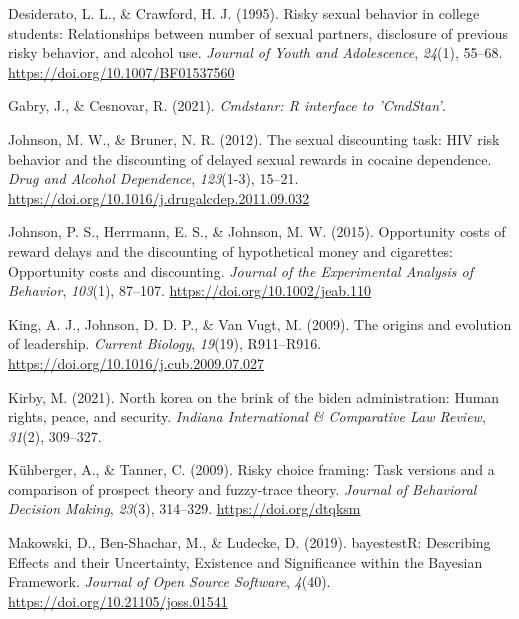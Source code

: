 \documentclass[
  donotrepeattitle,doc, 12pt, a4paper,floatsintext]{apa7}
\newlength{\cslhangindent}
\newlength{\cslentryspacingunit} %
\newenvironment{CSLReferences}[2] %
 {%
  \setlength{\parindent}{0pt}
  \ifodd #1
  \let\oldpar\par
  \def\par{\hangindent=\cslhangindent\oldpar}
  \fi
  \setlength{\parskip}{#2\cslentryspacingunit}
 }%
 {}
\begin{document}
\begin{CSLReferences}{1}{0}
\leavevmode{}%
Desiderato, L. L., \& Crawford, H. J. (1995). Risky sexual behavior in college students: Relationships between number of sexual partners, disclosure of previous risky behavior, and alcohol use. \emph{Journal of Youth and Adolescence}, \emph{24}(1), 55--68. \url{https://doi.org/10.1007/BF01537560}

\leavevmode{}%
Gabry, J., \& Cesnovar, R. (2021). \emph{Cmdstanr: {R} interface to '{CmdStan}'}.

\leavevmode{}%
Johnson, M. W., \& Bruner, N. R. (2012). The sexual discounting task: {HIV} risk behavior and the discounting of delayed sexual rewards in cocaine dependence. \emph{Drug and Alcohol Dependence}, \emph{123}(1-3), 15--21. \url{https://doi.org/10.1016/j.drugalcdep.2011.09.032}

\leavevmode{}%
Johnson, P. S., Herrmann, E. S., \& Johnson, M. W. (2015). Opportunity costs of reward delays and the discounting of hypothetical money and cigarettes: Opportunity costs and discounting. \emph{Journal of the Experimental Analysis of Behavior}, \emph{103}(1), 87--107. \url{https://doi.org/10.1002/jeab.110}

\leavevmode{}%
King, A. J., Johnson, D. D. P., \& Van Vugt, M. (2009). The origins and evolution of leadership. \emph{Current Biology}, \emph{19}(19), R911--R916. \url{https://doi.org/10.1016/j.cub.2009.07.027}

\leavevmode{}%
Kirby, M. (2021). North korea on the brink of the biden administration: Human rights, peace, and security. \emph{Indiana International \& Comparative Law Review}, \emph{31}(2), 309--327.

\leavevmode{}%
Kühberger, A., \& Tanner, C. (2009). Risky choice framing: Task versions and a comparison of prospect theory and fuzzy-trace theory. \emph{Journal of Behavioral Decision Making}, \emph{23}(3), 314--329. \url{https://doi.org/dtqksm}

\leavevmode{}%
Makowski, D., Ben-Shachar, M., \& Ludecke, D. (2019). {bayestestR}: {Describing Effects} and their {Uncertainty}, {Existence} and {Significance} within the {Bayesian Framework}. \emph{Journal of Open Source Software}, \emph{4}(40). \url{https://doi.org/10.21105/joss.01541}


\end{CSLReferences}
\end{document}
